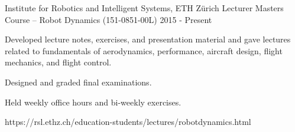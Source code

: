 \label{sec:teaching}
\begin{cventries}


\cvteachentry
  	{Institute for Robotics and Intelligent Systems, ETH Z\"{u}rich} %
  	{Lecturer} %
    {Masters Course -- Robot Dynamics (151-0851-00L)} %
    {2015 - Present} %
    {
      \begin{cvitems} %
        \item Developed lecture notes, exercises, and presentation material and gave lectures related to fundamentals of aerodynamics, performance, aircraft design, flight mechanics, and flight control.
		\item Designed and graded final examinations.
		\item Held weekly office hours and bi-weekly exercises.
      \end{cvitems}
    } %
    {https://rsl.ethz.ch/education-students/lectures/robotdynamics.html} %
    {\showteachingdescriptions}


\end{cventries}
